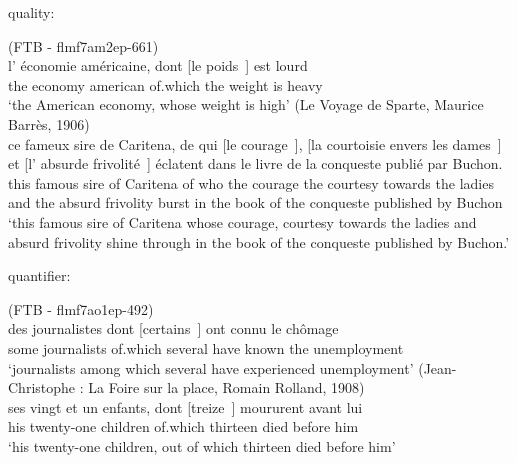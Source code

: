 \begin{exe}
\ex quality: \label{ex:quality}
\begin{xlist}
\ex (FTB - flmf7am2ep-661)\\
\gll l' économie américaine, dont [le poids~\trace{}] est lourd\\
the economy american of.which the weight is heavy\\
\glt `the American economy, whose weight is high'
\ex (Le Voyage de Sparte, Maurice Barrès, 1906)\\
\gll ce fameux sire de Caritena, de qui [le courage~\trace{}], [la courtoisie envers les dames~\trace{}] et [l' absurde frivolité~\trace{}] éclatent dans le livre de la conqueste publié par Buchon.\\
this famous sire of Caritena of who the courage the courtesy towards the ladies and the absurd frivolity burst in the book of the conqueste published by Buchon\\
\glt `this famous sire of Caritena whose courage, courtesy towards the ladies and absurd frivolity shine through in the book of the conqueste published by Buchon.'
\end{xlist}


\ex quantifier: \label{ex:quantifier}
\begin{xlist}
\ex (FTB - flmf7ao1ep-492)\\
\gll des journalistes dont [certains~\trace{}] ont connu le chômage\\
some journalists of.which several have known the unemployment \\
\glt `journalists among which several have experienced unemployment'
\ex (Jean-Christophe : La Foire sur la place, Romain Rolland, 1908)\\
\gll ses {vingt et un} enfants, dont [treize~\trace{}] moururent avant lui\\
his twenty-one children of.which thirteen died before him\\
\glt `his twenty-one children, out of which thirteen died before him'
\end{xlist}



\end{exe}

